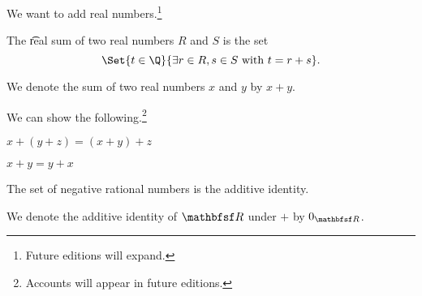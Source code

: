 

We want to add real numbers.\footnote{Future editions will expand.}


The \t{real sum} of two real numbers $R$ and $S$ is the set
\[
  \Set{t \in \Q}{\exists r \in R, s \in S \text{ with } t = r + s}.
\]


We denote the sum of two real numbers $x$ and $y$ by $x + y$.


We can show the following.\footnote{Accounts will appear in future editions.}

\begin{proposition}[Associative]
  $x + (y + z) = (x + y) + z$
\end{proposition}

\begin{proposition}[Commutative]
  $x + y = y + x$
\end{proposition}

\begin{proposition}[Identity]
  The set of negative rational numbers is the additive identity.
\end{proposition}

We denote the additive identity of $\R$ under $+$ by $0_{\R}$.

\ssectio

\blankpage
